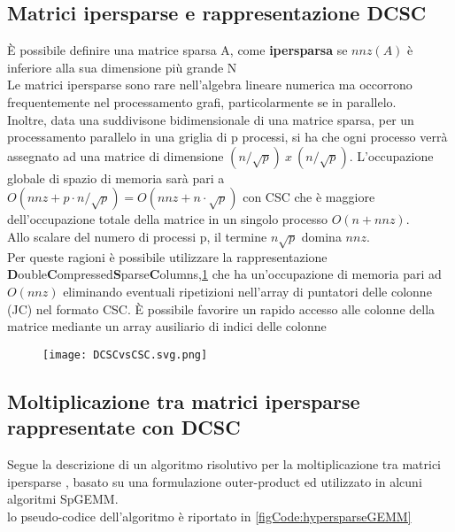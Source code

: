 \subsection{Matrici ipersparse e rappresentazione DCSC}
È possibile definire una matrice sparsa A, come {\bf ipersparsa }se $nnz(A)$ è
inferiore alla sua dimensione più grande N\\ %
Le matrici ipersparse sono rare nell'algebra lineare numerica ma occorrono 
frequentemente nel processamento grafi, particolarmente se in parallelo.\\

Inoltre, data una suddivisone bidimensionale di una matrice sparsa, %
per un processamento parallelo in una griglia di p processi, si ha che ogni processo
verrà assegnato ad una matrice di dimensione $(n/\sqrt{p})~x~(n/\sqrt{p})$.
L'occupazione globale di spazio di memoria sarà pari a 
$O(nnz + p \cdot n/\sqrt{p}) = O(nnz + n \cdot \sqrt{p})$ con CSC che è maggiore
dell'occupazione totale della matrice in un singolo processo $O(n + nnz)$.\\
Allo scalare del numero di processi p, il termine $n\sqrt{p}$ domina $nnz$.\\

Per queste ragioni è possibile utilizzare la rappresentazione 
{\bf D}ouble{\bf C}ompressed{\bf S}parse{\bf C}olumns,\ref{fig:DCSCvsCSC}
che ha un'occupazione di memoria pari ad $O(nnz)$
eliminando eventuali ripetizioni nell'array di puntatori delle colonne (JC) nel formato CSC.
È possibile favorire un rapido accesso alle colonne della matrice mediante un
array ausiliario di indici delle colonne \nnz
\begin{figure}[h]
  \caption[confronto delle rappresentazioni DCSC e CSC ]
  \centering \texttt{[image: DCSCvsCSC.svg.png]} \label{fig:DCSCvsCSC}
\end{figure}

\subsection{Moltiplicazione tra matrici ipersparse rappresentate con DCSC}
\label{ssec:hypersparseGEMM}
Segue la descrizione di un algoritmo risolutivo per la moltiplicazione tra matrici
ipersparse \parencite{2dNewIdeas}, basato su una formulazione outer-product ed
utilizzato in alcuni algoritmi SpGEMM.\\
lo pseudo-codice dell'algoritmo è riportato in \ref{figCode:hypersparseGEMM} 


